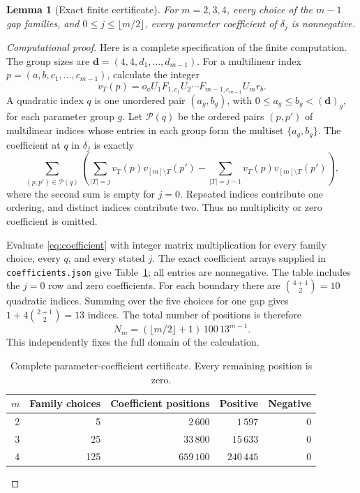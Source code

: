 \documentclass[11pt]{article}
\newtheorem{lemma}[theorem]{Lemma}
\begin{document}
\begin{lemma}[Exact finite certificate]\label{lem:certificate}
For $m=2,3,4$, every choice of the $m-1$ gap families, and
$0\le j\le\lfloor m/2\rfloor$, every parameter coefficient of
$\delta_j$ is nonnegative.
\end{lemma}
\begin{proof}[Computational proof]
Here is a complete specification of the finite computation.
The group sizes are $\boldsymbol d=(4,4,d_1,\ldots,d_{m-1})$.
For a multilinear index $p=(a,b,c_1,\ldots,c_{m-1})$, calculate the integer
\[
 v_T(p)=o_aU_1F_{1,c_1}U_2\cdots F_{m-1,c_{m-1}}U_mr_b.
\]
A quadratic index $q$ is one unordered pair $(a_g,b_g)$, with
$0\le a_g\le b_g<(\boldsymbol d)_g$, for each parameter group $g$.
Let $\mathcal P(q)$ be the ordered pairs $(p,p')$ of multilinear indices
whose entries in each group form the multiset $\{a_g,b_g\}$.
The coefficient at $q$ in $\delta_j$ is exactly
\begin{equation}\label{eq:coefficient}
 \sum_{(p,p')\in\mathcal P(q)}\left(
 \sum_{|T|=j}v_T(p)v_{[m]\setminus T}(p')
 -\sum_{|T|=j-1}v_T(p)v_{[m]\setminus T}(p')\right),
\end{equation}
where the second sum is empty for $j=0$.
Repeated indices contribute one ordering, and distinct indices contribute
two. Thus no multiplicity or zero coefficient is omitted.

Evaluate \eqref{eq:coefficient} with integer matrix multiplication for
every family choice, every $q$, and every stated $j$.
The exact coefficient arrays supplied in \texttt{coefficients.json}
give Table~\ref{tab:certificate}; all entries are nonnegative.
The table includes the $j=0$ row and zero coefficients.
For each boundary there are $\binom{4+1}{2}=10$ quadratic indices.
Summing over the five choices for one gap gives
$1+4\binom{2+1}{2}=13$ indices. The total number of positions is therefore
\begin{equation}\label{eq:coverage}
 N_m=(\lfloor m/2\rfloor+1)\,100\,13^{m-1}.
\end{equation}
This independently fixes the full domain of the calculation.

\begin{table}[htbp]
\centering
\begin{tabular}{rrrrr}
\toprule
$m$ & Family choices & Coefficient positions & Positive & Negative\\
\midrule
2 & 5   & $2\,600$   & $1\,597$   & 0\\
3 & 25  & $33\,800$  & $15\,633$  & 0\\
4 & 125 & $659\,100$ & $240\,445$ & 0\\
\bottomrule
\end{tabular}
\caption{Complete parameter-coefficient certificate. Every remaining
position is zero.}\label{tab:certificate}
\end{table}


\end{proof}
\end{document}
